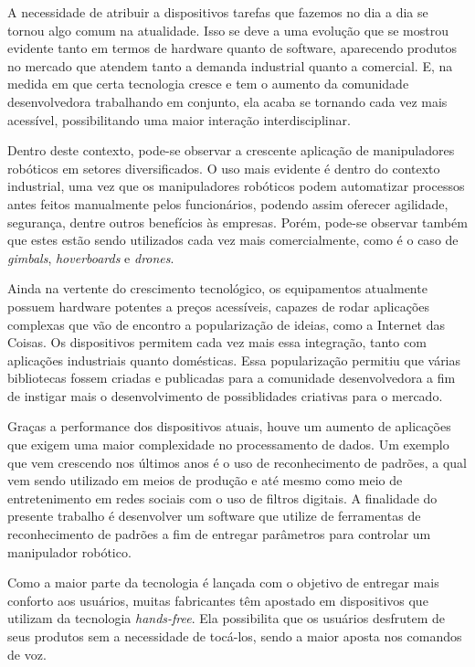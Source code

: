 A necessidade de atribuir a dispositivos tarefas que fazemos no dia a dia se tornou algo comum na atualidade. Isso se deve a uma evolução que se mostrou evidente tanto em termos de hardware quanto de software, aparecendo produtos no mercado que atendem tanto a demanda industrial quanto a comercial. E, na medida em que certa tecnologia cresce e tem o aumento da comunidade desenvolvedora trabalhando em conjunto, ela acaba se tornando cada vez mais acessível, possibilitando uma maior interação interdisciplinar.

Dentro deste contexto, pode-se observar a crescente aplicação de manipuladores robóticos em setores diversificados. O uso mais evidente é dentro do contexto industrial, uma vez que os manipuladores robóticos podem automatizar processos antes feitos manualmente pelos funcionários, podendo assim oferecer agilidade, segurança, dentre outros benefícios às empresas. Porém, pode-se observar também que estes estão sendo utilizados cada vez mais comercialmente, como é o caso de \textit{gimbals}, \textit{hoverboards} e \textit{drones}.

Ainda na vertente do crescimento tecnológico, os equipamentos atualmente possuem hardware potentes a preços acessíveis, capazes de rodar aplicações complexas que vão de encontro a popularização de ideias, como a Internet das Coisas. Os dispositivos permitem cada vez mais essa integração, tanto com aplicações industriais quanto domésticas. Essa popularização permitiu que várias bibliotecas fossem criadas e publicadas para a comunidade desenvolvedora a fim de instigar mais o desenvolvimento de possiblidades criativas para o mercado.

Graças a performance dos dispositivos atuais, houve um aumento de aplicações que exigem uma maior complexidade no processamento de dados. Um exemplo que vem crescendo nos últimos anos é o uso de reconhecimento de padrões, a qual vem sendo utilizado em meios de produção e até mesmo como meio de entretenimento em redes sociais com o uso de filtros digitais. A finalidade do presente trabalho é desenvolver um software que utilize de ferramentas de reconhecimento de padrões a fim de entregar parâmetros para controlar um manipulador robótico.

Como a maior parte da tecnologia é lançada com o objetivo de entregar mais conforto aos usuários, muitas fabricantes têm apostado em dispositivos que utilizam da tecnologia \textit{hands-free}. Ela possibilita que os usuários desfrutem de seus produtos sem a necessidade de tocá-los, sendo a maior aposta nos comandos de voz.

